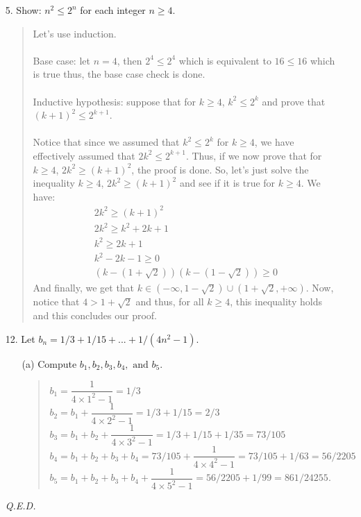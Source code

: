 \documentclass[12pt, a4paper]{article}                      %
\begin{document}
\begin{itemize}
{\Large Bookwork}
\item[]
\item[5.]
Show: $n^2 \leq 2^n$ for each integer $n \geq 4$.
\begin{quote}
Let's use induction.\\\\
Base case: let $n = 4$, then $2^4 \leq 2^4$ which is equivalent to $16 \leq 16$ which is true
thus, the base case check is done.\\\\
Inductive hypothesis: suppose that for $k \geq 4$, $k^2 \leq 2^k$ and prove that $(k + 1)^2 \leq 2^{k + 1}$.\\\\
Notice that since we assumed that $k^2 \leq 2^k$ for $k \geq 4$, we have effectively assumed that $2k^2 \leq 2^{k + 1}$.
Thus, if we now prove that for $k \geq 4$, $2k^2 \geq (k + 1)^2$, the proof is done. So, let's just solve the inequality $k \geq 4$, $2k^2 \geq (k + 1)^2$
and see if it is true for $k \geq 4$. We have:
\begin{align}
2k^2 \geq (k + 1)^2\\
2k^2 \geq k^2 + 2k + 1\\
k^2 \geq 2k + 1\\
k^2 - 2k - 1 \geq 0\\
(k - (1 + \sqrt{2}))(k - (1 - \sqrt{2})) \geq 0
\end{align}
And finally, we get that $k \in (-\infty, 1 - \sqrt{2}) \cup (1 + \sqrt{2}, +\infty)$.
Now, notice that $4 > 1 + \sqrt{2}$ and thus, for all $k \geq 4$, this inequality holds
and this concludes our proof.
\end{quote}

\item[]
\item[12.]
Let $b_n = 1/3 + 1/15 + ... + 1/(4n^2 - 1)$.
\begin{itemize}
\item[(a)]
Compute $b_1, b_2, b_3, b_4, \mbox{ and } b_5$.
\begin{quote}

$b_1 = \dfrac{1}{4 \times 1^2 - 1} = 1/3$\\
$b_2 = b_1 + \dfrac{1}{4 \times 2^2 - 1} = 1/3 + 1/15 = 2/3$\\
$b_3 = b_1 + b_2 + \dfrac{1}{4 \times 3^2 - 1} = 1/3 + 1/15 + 1/35 = 73/105$\\
$b_4 = b_1 + b_2 + b_3 + b_4 = 73/105 + \dfrac{1}{4 \times 4^2 - 1} = 73/105 + 1/63 = 56/2205$
$b_5 = b_1 + b_2 + b_3 + b_4 + \dfrac{1}{4 \times 5^2 - 1} = 56/2205 + 1/99 = 861/24255$.
\end{quote}
\end{itemize}
\begin{flushright}
\textit{Q.E.D.}
\end{flushright}
\end{itemize}
\end{document}
